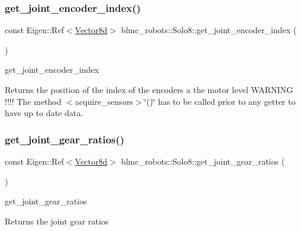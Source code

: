 \subsubsection{\texorpdfstring{get\+\_\+joint\+\_\+encoder\+\_\+index()}{get\_joint\_encoder\_index()}}
{\footnotesize\ttfamily const Eigen\+::\+Ref$<$\hyperlink{common__header_8hpp_a98975ffbe0bca1296078e0350dfedd60}{Vector8d}$>$ blmc\+\_\+robots\+::\+Solo8\+::get\+\_\+joint\+\_\+encoder\+\_\+index (\begin{DoxyParamCaption}{ }\end{DoxyParamCaption})\hspace{0.3cm}{\ttfamily [inline]}}



get\+\_\+joint\+\_\+encoder\+\_\+index 

\begin{DoxyReturn}{Returns}
the position of the index of the encoders a the motor level W\+A\+R\+N\+I\+NG !!!! The method $<$acquire\+\_\+sensors$>$\char`\"{}()\char`\"{} has to be called prior to any getter to have up to date data. 
\end{DoxyReturn}
\mbox{\label{classblmc__robots_1_1Solo8_a1fc849d9d2dfd936fa00147e184b8e5a}} 
\subsubsection{\texorpdfstring{get\+\_\+joint\+\_\+gear\+\_\+ratios()}{get\_joint\_gear\_ratios()}}
{\footnotesize\ttfamily const Eigen\+::\+Ref$<$\hyperlink{common__header_8hpp_a98975ffbe0bca1296078e0350dfedd60}{Vector8d}$>$ blmc\+\_\+robots\+::\+Solo8\+::get\+\_\+joint\+\_\+gear\+\_\+ratios (\begin{DoxyParamCaption}{ }\end{DoxyParamCaption})\hspace{0.3cm}{\ttfamily [inline]}}



get\+\_\+joint\+\_\+gear\+\_\+ratios 

\begin{DoxyReturn}{Returns}
the joint gear ratios 
\end{DoxyReturn}
\mbox{\label{classblmc__robots_1_1Solo8_ab067a976ebce2882b84e2d115832839d}} 
